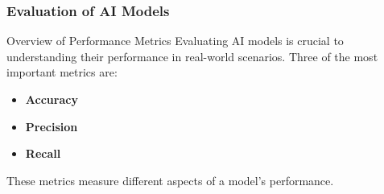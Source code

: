 \documentclass[aspectratio=169]{beamer}
\begin{document}
\begin{frame}
    \frametitle{Evaluation of AI Models}
    \begin{block}{Overview of Performance Metrics}
        Evaluating AI models is crucial to understanding their performance in real-world scenarios. Three of the most important metrics are:
        \begin{itemize}
            \item \textbf{Accuracy}
            \item \textbf{Precision}
            \item \textbf{Recall}
        \end{itemize}
        These metrics measure different aspects of a model's performance.
    \end{block}
\end{frame}
\end{document}
